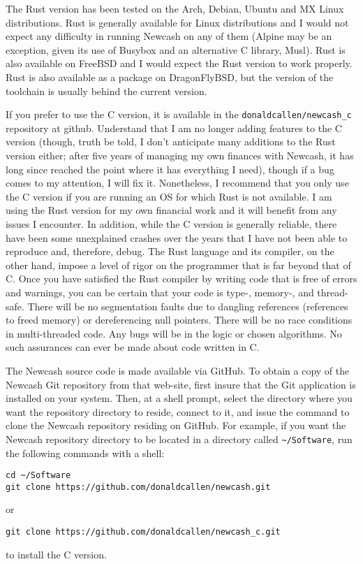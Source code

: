 \documentclass{report}
\begin{document}
The Rust version has been tested on the Arch, Debian, Ubuntu and MX Linux distributions. Rust is generally available for Linux distributions and I would not expect any difficulty in running Newcash on any of them (Alpine may be an exception, given its use
of Busybox and an alternative C library, Musl). Rust is also available on FreeBSD and I would expect the Rust version to work properly. Rust is also available as a package on DragonFlyBSD, but the version of the toolchain is usually behind
the current version. 

If you prefer to use the C version, it is available in the \verb|donaldcallen/newcash_c| repository at github. Understand that I am no longer adding features to the C version (though, truth be told, 
I don't anticipate many additions to the Rust version either; after five years of managing my own finances with Newcash, it has long since reached the point where it has everything
I need), though if a bug comes to my attention, I will fix it. Nonetheless, I recommend that you only use the C version if you are running an OS for which Rust is not available. I am using the Rust version for my own financial
work and it will benefit from any issues I encounter. In addition, while the C version is generally reliable, there have been some unexplained crashes over the years that I have not been able to reproduce and, therefore, debug.
The Rust language and its compiler, on the other hand, impose a level of rigor on the programmer that is far beyond that of C. Once you have satisfied the Rust compiler by writing code that is free of errors and warnings, you can be certain that your code is
type-, memory-, and thread-safe. There will be no segmentation faults due to dangling references (references to freed memory) or dereferencing null pointers. There will be no race conditions in multi-threaded code. Any bugs will be in the logic or chosen algorithms.  No such assurances can ever be made about code written in C.

The Newcash source code is made available via GitHub. To obtain a copy of the Newcash Git repository from that web-site, first insure that the Git application is installed on your system. 
Then, at a shell prompt, select the directory where you want the repository directory to reside, connect to it, and issue the command to clone the Newcash repository residing on GitHub. 
For example, if you want the Newcash repository directory to be located in a directory called \verb|~/Software|, run the following commands with a shell:
\begin{verbatim}
cd ~/Software
git clone https://github.com/donaldcallen/newcash.git
\end{verbatim}
or
\begin{verbatim}
git clone https://github.com/donaldcallen/newcash_c.git
\end{verbatim}
to install the C version.
\end{document}
